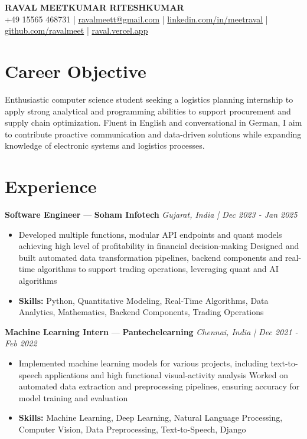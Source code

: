 \documentclass[a4paper,10pt]{article}
\begin{document}
\begin{center}
  {\Large\bfseries RAVAL MEETKUMAR RITESHKUMAR}\\[2pt]
  {\small +49 15565 468731 \;|\; \href{mailto:ravalmeett@gmail.com}{ravalmeett@gmail.com} \;|\; \href{https://www.linkedin.com/in/meetraval/}{linkedin.com/in/meetraval} \;|\; \href{https://github.com/ravalmeet}{github.com/ravalmeet} \;|\; \href{https://raval.vercel.app/}{raval.vercel.app}}
\end{center}
\vspace{-3pt}

\section*{Career Objective}
Enthusiastic computer science student seeking a logistics planning internship to apply strong analytical and programming abilities to support procurement and supply chain optimization. Fluent in English and conversational in German, I aim to contribute proactive communication and data-driven solutions while expanding knowledge of electronic systems and logistics processes.\par

\section*{Experience}
\textbf{Software Engineer} — \textbf{Soham Infotech} \hfill \textit{Gujarat, India \;|\; Dec 2023 - Jan 2025}\par
\vspace{1pt}
\begin{itemize}
  \item Developed multiple functions, modular API endpoints and quant models achieving high level of profitability in financial decision-making Designed and built automated data transformation pipelines, backend components and real-time algorithms to support trading operations, leveraging quant and AI algorithms
  \item \textbf{Skills:} Python, Quantitative Modeling, Real-Time Algorithms, Data Analytics, Mathematics, Backend Components, Trading Operations
\end{itemize}
\vspace{3pt}
\textbf{Machine Learning Intern} — \textbf{Pantechelearning} \hfill \textit{Chennai, India \;|\; Dec 2021 - Feb 2022}\par
\vspace{1pt}
\begin{itemize}
  \item Implemented machine learning models for various projects, including text-to-speech applications and high functional visual-activity analysis Worked on automated data extraction and preprocessing pipelines, ensuring accuracy for model training and evaluation
  \item \textbf{Skills:} Machine Learning, Deep Learning, Natural Language Processing, Computer Vision, Data Preprocessing, Text-to-Speech, Django
\end{itemize}
\end{document}
